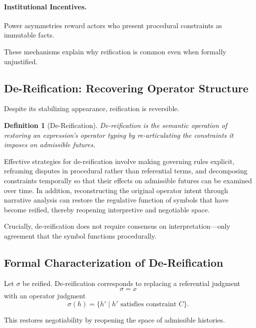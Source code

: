 \documentclass[11pt]{article}
\newtheorem{definition}{Definition}
\begin{document}
\paragraph{Institutional Incentives.}
Power asymmetries reward actors who present procedural constraints as immutable
facts.

These mechanisms explain why reification is common even when formally unjustified.

\subsection{De-Reification: Recovering Operator Structure}

Despite its stabilizing appearance, reification is reversible.

\begin{definition}[De-Reification]
De-reification is the semantic operation of restoring an expression’s operator
typing by re-articulating the constraints it imposes on admissible futures.
\end{definition}

Effective strategies for de-reification involve making governing rules explicit,
reframing disputes in procedural rather than referential terms, and decomposing
constraints temporally so that their effects on admissible futures can be
examined over time. In addition, reconstructing the original operator intent
through narrative analysis can restore the regulative function of symbols that
have become reified, thereby reopening interpretive and negotiable space.


Crucially, de-reification does not require consensus on interpretation—only
agreement that the symbol functions procedurally.

\subsection{Formal Characterization of De-Reification}

Let $\sigma$ be reified. De-reification corresponds to replacing a referential
judgment
\[
\sigma = x
\]
with an operator judgment
\[
\sigma(h) = \{ h' \mid h' \text{ satisfies constraint } C \}.
\]

This restores negotiability by reopening the space of admissible histories.
\end{document}
